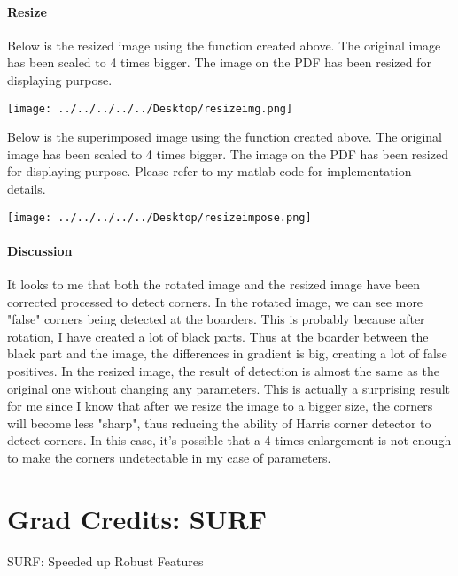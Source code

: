 \documentclass[11pt, oneside]{article}   	%
\begin{document}
\paragraph{Resize} Below is the resized image using the function created above. The original image has been scaled to 4 times bigger. The image on the PDF has been resized for displaying purpose.\newline\newline
\begin{center}
\texttt{[image: ../../../../../Desktop/resizeimg.png]}
\end{center}
Below is the superimposed image using the function created above. The original image has been scaled to 4 times bigger. The image on the PDF has been resized for displaying purpose. Please refer to my matlab code for implementation details.
\newline\newline
\begin{center}
\texttt{[image: ../../../../../Desktop/resizeimpose.png]}
\end{center}
\paragraph{Discussion}It looks to me that both the rotated image and the resized image have been corrected processed to detect corners. In the rotated image, we can see more "false" corners being detected at the boarders. This is probably because after rotation, I have created a lot of black parts. Thus at the boarder between the black part and the image, the differences in gradient is big, creating a lot of false positives.\newline 
In the resized image, the result of detection is almost the same as the original one without changing any parameters. This is actually a surprising result for me since I know that after we resize the image to a bigger size, the corners will become less "sharp", thus reducing the ability of Harris corner detector to detect corners. In this case, it's possible that a 4 times enlargement is not enough to make the corners undetectable in my case of parameters.

\section{Grad Credits: SURF}
\begin{center}
SURF: Speeded up Robust Features
\end{center}
\end{document}
